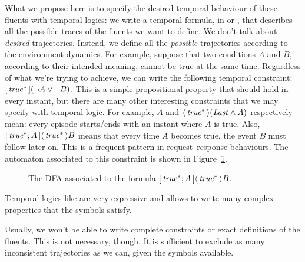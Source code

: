 What we propose here is to specify the desired temporal behaviour of these
fluents with temporal logics: we write a temporal formula, in \ltl{} or
\ldl{}, that describes all the possible traces of the fluents we want to
define. We don't talk about \emph{desired} trajectories. Instead, we define
all the \emph{possible} trajectories according to the environment dynamics.
For example, suppose that two conditions $A$ and $B$, according to their
intended meaning, cannot be true at the same time. Regardless of what we're
trying to achieve, we can write the following temporal constraint:
$[\, {\text{\textit{true}}^*} \,](\neg A \lor \neg B)$.  This is a simple propositional
property that should hold in every instant, but there are many other
interesting constraints that we may specify with temporal logic. For example,
$A$ and $\langle\, {\text{\textit{true}}^*} \,\rangle(\text{\textit{Last}} \land A)$ respectively mean: every episode
starts/ends with an instant where $A$ is true.  Also, $[\, {\text{\textit{true}}^*;
A} \,]\langle\, {\text{\textit{true}}^*} \,\rangle B$ means that every time $A$ becomes true, the event $B$
must follow later on. This is a frequent pattern in request--response
behaviours. The automaton associated to this constraint is shown in
Figure~\ref{fig:response-automa}.
\begin{figure}
		\centering
		\caption{The DFA associated to the formula ${[\, {\text{\textit{true}}^*;
			A} \,]\langle\, {\text{\textit{true}}^*} \,\rangle B}$.}
		\label{fig:response-automa}
\end{figure}
Temporal logics like \ldl{} are very expressive and allows to write many
complex properties that the symbols satisfy.

Usually, we won't be able to write complete constraints or exact definitions
of the fluents. This is not necessary, though. It is sufficient to exclude as
many inconsistent trajectories as we can, given the symbols available.

